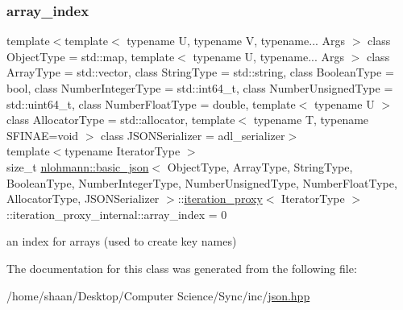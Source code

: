 \subsubsection{\texorpdfstring{array\+\_\+index}{array\_index}}
{\footnotesize\ttfamily template$<$template$<$ typename U, typename V, typename... Args $>$ class Object\+Type = std\+::map, template$<$ typename U, typename... Args $>$ class Array\+Type = std\+::vector, class String\+Type  = std\+::string, class Boolean\+Type  = bool, class Number\+Integer\+Type  = std\+::int64\+\_\+t, class Number\+Unsigned\+Type  = std\+::uint64\+\_\+t, class Number\+Float\+Type  = double, template$<$ typename U $>$ class Allocator\+Type = std\+::allocator, template$<$ typename T, typename S\+F\+I\+N\+A\+E=void $>$ class J\+S\+O\+N\+Serializer = adl\+\_\+serializer$>$ \\
template$<$typename Iterator\+Type $>$ \\
size\+\_\+t \hyperlink{classnlohmann_1_1basic__json}{nlohmann\+::basic\+\_\+json}$<$ Object\+Type, Array\+Type, String\+Type, Boolean\+Type, Number\+Integer\+Type, Number\+Unsigned\+Type, Number\+Float\+Type, Allocator\+Type, J\+S\+O\+N\+Serializer $>$\+::\hyperlink{classnlohmann_1_1basic__json_1_1iteration__proxy}{iteration\+\_\+proxy}$<$ Iterator\+Type $>$\+::iteration\+\_\+proxy\+\_\+internal\+::array\+\_\+index = 0\hspace{0.3cm}{\ttfamily [private]}}



an index for arrays (used to create key names) 



The documentation for this class was generated from the following file\+:\begin{DoxyCompactItemize}
\item 
/home/shaan/\+Desktop/\+Computer Science/\+Sync/inc/\hyperlink{json_8hpp}{json.\+hpp}\end{DoxyCompactItemize}
